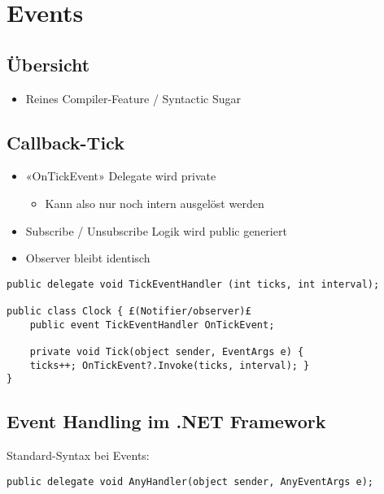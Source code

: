 
\section{Events}

\subsection{Übersicht}
\begin{itemize}
    \item Reines Compiler-Feature / Syntactic Sugar
\end{itemize}

\subsection{Callback-Tick}
\begin{itemize}
    \item «OnTickEvent» Delegate wird private
    \begin{itemize}
        \item Kann also nur noch intern ausgelöst werden
    \end{itemize}
    \item Subscribe / Unsubscribe Logik wird public generiert
    \item Observer bleibt identisch
\end{itemize}

\begin{lstlisting}
public delegate void TickEventHandler (int ticks, int interval);

public class Clock { £(Notifier/observer)£
    public event TickEventHandler OnTickEvent;

    private void Tick(object sender, EventArgs e) {
    ticks++; OnTickEvent?.Invoke(ticks, interval); }
}
\end{lstlisting}


\subsection{Event Handling im .NET Framework}

Standard-Syntax bei Events:
\begin{lstlisting}
public delegate void AnyHandler(object sender, AnyEventArgs e);
\end{lstlisting}

